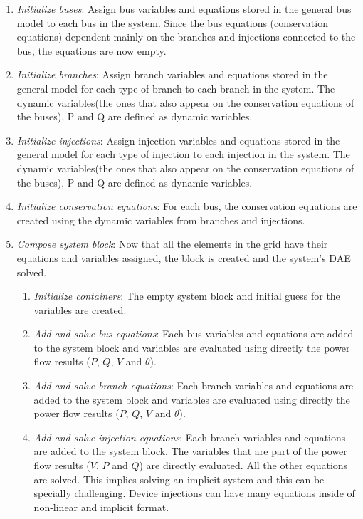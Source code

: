 \begin{enumerate}
  \item \textit{Initialize buses}: Assign bus variables and equations stored in the general bus model to each bus in the system. Since the bus equations (conservation equations) dependent
  mainly on the branches and injections connected to the bus, the equations are now empty.
  \item \textit{Initialize branches}: Assign branch variables and equations stored in the general model for each type of branch to each branch in the system. The dynamic variables(the ones that also appear
  on the conservation equations of the buses), P and Q are defined as dynamic variables.
  \item \textit{Initialize injections}: Assign injection variables and equations stored in the general model for each type of injection to each injection in the system. The dynamic variables(the ones that also appear
  on the conservation equations of the buses), P and Q are defined as dynamic variables.
  \item \textit{Initialize conservation equations}: For each bus, the conservation equations are created using the dynamic variables from branches and injections.
  \item \textit{Compose system block}: Now that all the elements in the grid have their equations and variables assigned, the block is created and the system's DAE solved.
    \begin{enumerate}
    \item \textit{Initialize containers}: The empty system block and initial guess for the variables are created.
    \item \textit{Add and solve bus equations}: Each bus variables and equations are added to the system block and variables are evaluated using directly the power flow results ($P$, $Q$, $V$ and $\theta$).
    \item \textit{Add and solve branch equations}: Each branch variables and equations are added to the system block and variables are evaluated using directly the power flow results ($P$, $Q$, $V$ and $\theta$).
    \item \textit{Add and solve injection equations}: Each branch variables and equations are added to the system block. 
    The variables that are part of the power flow results ($V$, $P$ and $Q$) are directly evaluated.
    All the other equations are solved. This implies solving an implicit system and this can be specially challenging. Device injections can have many equations inside of non-linear and implicit format.
    \end{enumerate}
\end{enumerate}

